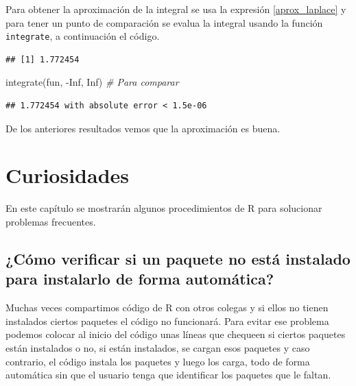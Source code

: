\documentclass[
]{book}
\makeatletter
\newenvironment{Shaded}{\begin{snugshade}}{\end{snugshade}}
\newcommand{\CommentTok}[1]{\textcolor[rgb]{0.56,0.35,0.01}{\textit{#1}}}
\newcommand{\ConstantTok}[1]{\textcolor[rgb]{0.00,0.00,0.00}{#1}}
\newcommand{\DecValTok}[1]{\textcolor[rgb]{0.00,0.00,0.81}{#1}}
\newcommand{\FunctionTok}[1]{\textcolor[rgb]{0.00,0.00,0.00}{#1}}
\newcommand{\NormalTok}[1]{#1}
\newcommand{\SpecialCharTok}[1]{\textcolor[rgb]{0.00,0.00,0.00}{#1}}
\newenvironment{kframe}{%
\medskip{}
\setlength{\fboxsep}{.8em}
 \def\at@end@of@kframe{}%
 \ifinner\ifhmode%
  \def\at@end@of@kframe{\end{minipage}}%
  \begin{minipage}{\columnwidth}%
 \fi\fi%
 \def\FrameCommand##1{\hskip\@totalleftmargin \hskip-\fboxsep
 \colorbox{shadecolor}{##1}\hskip-\fboxsep
     \hskip-\linewidth \hskip-\@totalleftmargin \hskip\columnwidth}%
 \MakeFramed {\advance\hsize-\width
   \@totalleftmargin\z@ \linewidth\hsize
   \@setminipage}}%
 {\par\unskip\endMakeFramed%
 \at@end@of@kframe}
\renewenvironment{Shaded}{\begin{kframe}}{\end{kframe}}
\makeatother
\begin{document}
Para obtener la aproximación de la integral se usa la expresión \ref{aprox_laplace} y para tener un punto de comparación se evalua la integral usando la función \texttt{integrate}, a continuación el código.

\begin{Shaded}
\end{Shaded}

\begin{verbatim}
## [1] 1.772454
\end{verbatim}

\begin{Shaded}
\begin{Highlighting}[]
\FunctionTok{integrate}\NormalTok{(fun, }\SpecialCharTok{{-}}\ConstantTok{Inf}\NormalTok{, }\ConstantTok{Inf}\NormalTok{)  }\CommentTok{\# Para comparar}
\end{Highlighting}
\end{Shaded}

\begin{verbatim}
## 1.772454 with absolute error < 1.5e-06
\end{verbatim}

De los anteriores resultados vemos que la aproximación es buena.

\hypertarget{curio}{%
\chapter{Curiosidades}\label{curio}}

En este capítulo se mostrarán algunos procedimientos de R para solucionar problemas frecuentes.

\hypertarget{cuxf3mo-verificar-si-un-paquete-no-estuxe1-instalado-para-instalarlo-de-forma-automuxe1tica}{%
\section{¿Cómo verificar si un paquete no está instalado para instalarlo de forma automática?}\label{cuxf3mo-verificar-si-un-paquete-no-estuxe1-instalado-para-instalarlo-de-forma-automuxe1tica}}

Muchas veces compartimos código de R con otros colegas y si ellos no tienen instalados ciertos paquetes el código no funcionará. Para evitar ese problema podemos colocar al inicio del código unas líneas que chequeen si ciertos paquetes están instalados o no, si están instalados, se cargan esos paquetes y caso contrario, el código instala los paquetes y luego los carga, todo de forma automática sin que el usuario tenga que identificar los paquetes que le faltan.
\end{document}

